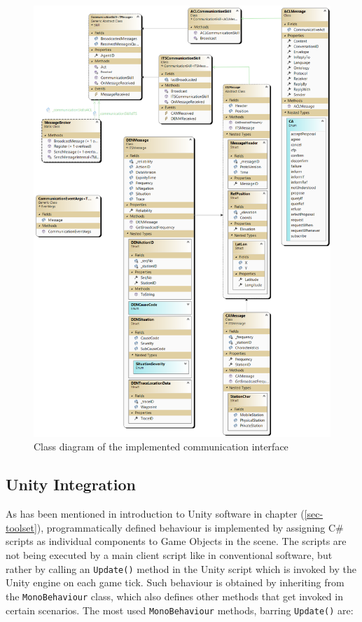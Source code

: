 \documentclass[main.tex]{subfiles}
\begin{document}
\begin{figure}[htbp]
    \centering
    \includegraphics[width=.99\textwidth]{mas-its-communication.png}
    \caption{Class diagram of the implemented communication interface}
    \label{fig-classes-comm}
\end{figure}

\subsection{Unity Integration}

As has been mentioned in introduction to Unity software in chapter (\ref{sec-toolset}), programmatically 
defined behaviour is implemented by assigning C\# scripts as individual components to Game Objects in 
the scene. The scripts are not being executed by a main client script like in conventional software, but 
rather by calling an \texttt{Update()} method in the Unity script which is invoked by the Unity engine 
on each game tick. Such behaviour is obtained by inheriting from the \texttt{MonoBehaviour} class, which 
also defines other methods that get invoked in certain scenarios. The most used \texttt{MonoBehaviour} 
methods, barring \texttt{Update()} are:
\end{document}
